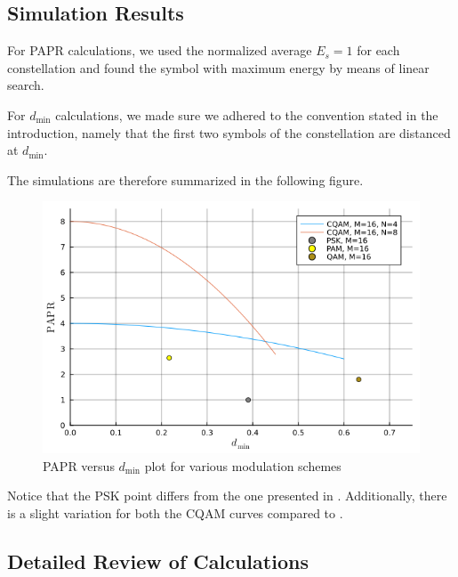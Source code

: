 \documentclass[11pt,a4paper,onecolumn,final]{article}
\newcommand{\dmin}{d_\text{min}}
\begin{document}
\subsection{Simulation Results}
For PAPR calculations, we used the normalized average \(E_s = 1\) for each constellation and found the symbol with maximum energy by means of linear search. 

For \(\dmin \) calculations, we made sure we adhered to the convention stated in the introduction, namely that the first two symbols of the constellation are distanced at \(\dmin\). 

The simulations are therefore summarized in the following figure. 

\newpage
\begin{figure}[h]
    \centering
    \includegraphics[scale=0.6]{ex1_sim.png}
    \caption{PAPR versus \(\dmin \) plot for various modulation schemes}
\end{figure}

Notice that the PSK point differs from the one presented in \cite{cqam}. Additionally, there is a slight variation for both the CQAM curves compared to \cite{cqam}. 

\subsection{Detailed Review of Calculations}
\end{document}

